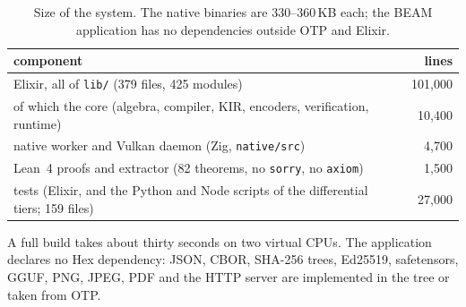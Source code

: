 \begin{table}[h]
\centering\small
\begin{tabular}{@{}lr@{}}
\toprule
component & lines \\
\midrule
Elixir, all of \texttt{lib/} (379 files, 425 modules) & 101{,}000 \\
\quad of which the core (algebra, compiler, KIR, encoders, verification, runtime) & 10{,}400 \\
native worker and Vulkan daemon (Zig, \texttt{native/src}) & 4{,}700 \\
Lean~4 proofs and extractor (82 theorems, no \texttt{sorry}, no \texttt{axiom}) & 1{,}500 \\
tests (Elixir, and the Python and Node scripts of the differential tiers; 159 files) & 27{,}000 \\
\bottomrule
\end{tabular}
\caption{Size of the system. The native binaries are 330--360\,KB each; the BEAM application has no
dependencies outside OTP and Elixir.}
\end{table}

A full build takes about thirty seconds on two virtual CPUs. The application declares no Hex
dependency: JSON, CBOR, SHA-256 trees, Ed25519, safetensors, GGUF, PNG, JPEG, PDF and the HTTP server are
implemented in the tree or taken from OTP.
